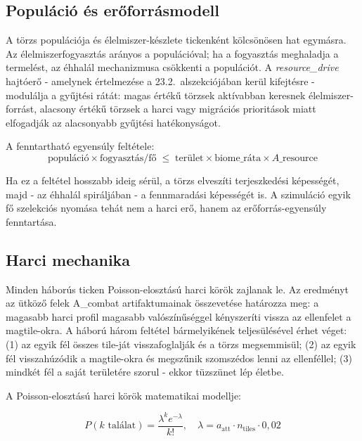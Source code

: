 \subsection*{Populáció és erőforrásmodell}

A törzs populációja és élelmiszer-készlete tickenként kölcsönösen hat egymásra. Az élelmiszerfogyasztás arányos a populációval; ha a fogyasztás meghaladja a termelést, az éhhalál mechanizmusa csökkenti a populációt. A \textit{resource\_drive} hajtóerő - amelynek értelmezése a 23.2.~alszekciójában kerül kifejtésre - modulálja a gyűjtési rátát: magas értékű törzsek aktívabban keresnek élelmiszer-forrást, alacsony értékű törzsek a harci vagy migrációs prioritások miatt elfogadják az alacsonyabb gyűjtési hatékonyságot.

A fenntartható egyensúly feltétele:
\begin{equation}
\text{populáció} \times \text{fogyasztás/fő} \;\leq\; \text{terület} \times \text{biome\_ráta} \times A\_\text{resource}
\end{equation}

Ha ez a feltétel hosszabb ideig sérül, a törzs elveszíti terjeszkedési képességét, majd - az éhhalál spiráljában - a fennmaradási képességét is. A szimuláció egyik fő szelekciós nyomása tehát nem a harci erő, hanem az erőforrás-egyensúly fenntartása.

\subsection*{Harci mechanika}

Minden háborús ticken Poisson-elosztású harci körök zajlanak le. Az eredményt az ütköző felek A\_combat artifaktumainak összevetése határozza meg: a magasabb harci profil magasabb valószínűséggel kényszeríti vissza az ellenfelet a magtile-okra. A háború három feltétel bármelyikének teljesülésével érhet véget: (1) az egyik fél összes tile-ját visszafoglalják és a törzs megsemmisül; (2) az egyik fél visszahúzódik a magtile-okra és megszűnik szomszédos lenni az ellenféllel; (3) mindkét fél a saját területére szorul - ekkor tüzszünet lép életbe.

A Poisson-elosztású harci körök matematikai modellje:

\begin{equation}
P(k \text{ találat}) = \frac{\lambda^k e^{-\lambda}}{k!},
\quad \lambda = a_{\text{att}} \cdot n_{\text{tiles}} \cdot 0{,}02
\end{equation}

